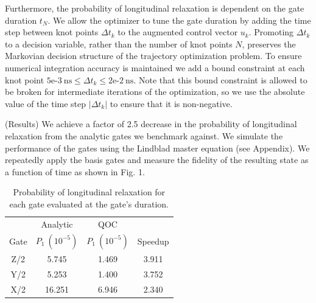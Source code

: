\documentclass[
  amsfonts,
  amsmath,
  tbtags,
  amssymb,
  aps,
  nobibnotes,
  twocolumn,
]{revtex4-2}
\begin{document}
Furthermore, the probability of longitudinal 
relaxation is dependent on the gate duration $t_{N}$.
We allow the optimizer to tune the gate duration by
adding the time step between knot points $\Delta t_{k}$
to the augmented control vector $u_{k}$.
Promoting $\Delta t_{k}$ to a decision variable, rather
than the number of knot points $N$, preserves the
Markovian decision structure of the trajectory
optimization problem. To ensure numerical
integration accuracy is maintained we add a bound
constraint at each knot point
$5\textrm{e-}3 \ \textrm{ns} \le
\Delta t_{k} \le 2\textrm{e-}2 \ \textrm{ns}$.
Note that this bound constraint is allowed to be
broken for intermediate iterations of the optimization,
so we use the absolute value of the time step
$\lvert \Delta t_{k} \rvert$ to ensure that it is non-negative.

(Results) We achieve a factor of 2.5 decrease in the probability
of longitudinal relaxation from the analytic gates we benchmark
against. We simulate the performance of the gates using the
Lindblad master equation (see Appendix). We repeatedly apply the basis gates
and measure the fidelity of the resulting state as a function
of time as shown in Fig. 1.


\begin{table}[ht]
  \begin{tabular}{c | c | c | c}
    & Analytic  & QOC &\\
    Gate & $P_{1}\ (10^{-5})$ & $P_{1}\ (10^{-5})$ & Speedup\\
    \hline
    Z/2 & 5.745 & 1.469 & 3.911\\
    Y/2 & 5.253 & 1.400 & 3.752\\
    X/2 & 16.251 & 6.946 & 2.340\\
  \end{tabular}
  \caption{Probability of longitudinal relaxation for each gate
    evaluated at the gate's duration.}
\end{table}
\end{document}
